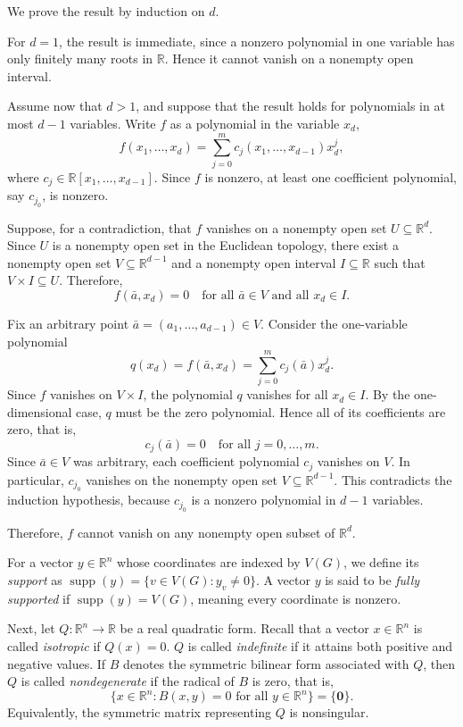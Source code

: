 \documentclass[12pt,reqno]{amsart}
\theoremstyle{definition}
\numberwithin{equation}{subsection}
\newenvironment{pf}{\proof}{\endproof}
\numberwithin{equation}{section}
\begin{document}
\begin{pf}
We prove the result by induction on $d$.

For $d=1$, the result is immediate, since a nonzero polynomial in one variable has only finitely many roots in $\mathbb{R}$. Hence it cannot vanish on a nonempty open interval.

Assume now that $d>1$, and suppose that the result holds for polynomials in at most $d-1$ variables. Write $f$ as a polynomial in the variable $x_d$,
\[
f(x_1,\dots,x_d)
=
\sum_{j=0}^{m} c_j(x_1,\dots,x_{d-1})x_d^j,
\]
where $c_j\in \mathbb{R}[x_1,\dots,x_{d-1}]$. Since $f$ is nonzero, at least one coefficient polynomial, say $c_{j_0}$, is nonzero.

Suppose, for a contradiction, that $f$ vanishes on a nonempty open set $U\subseteq \mathbb{R}^d$. Since $U$ is a nonempty open set in the Euclidean topology, there exist a nonempty open set $V\subseteq \mathbb{R}^{d-1}$ and a nonempty open interval $I\subseteq \mathbb{R}$ such that
\(
V\times I\subseteq U.
\)
Therefore,
\[
f(\bar a,x_d)=0
\quad
\text{for all } \bar a\in V \text{ and all } x_d\in I.
\]

Fix an arbitrary point $\bar a=(a_1,\dots,a_{d-1})\in V$. Consider the one-variable polynomial
\[
q(x_d)=f(\bar a,x_d)
=
\sum_{j=0}^{m} c_j(\bar a)x_d^j.
\]
Since $f$ vanishes on $V\times I$, the polynomial $q$ vanishes for all $x_d\in I$. By the one-dimensional case, $q$ must be the zero polynomial. Hence all of its coefficients are zero, that is,
\[
c_j(\bar a)=0
\quad
\text{for all } j=0,\dots,m.
\]
Since $\bar a\in V$ was arbitrary, each coefficient polynomial $c_j$ vanishes on $V$. In particular, $c_{j_0}$ vanishes on the nonempty open set $V\subseteq \mathbb{R}^{d-1}$. This contradicts the induction hypothesis, because $c_{j_0}$ is a nonzero polynomial in $d-1$ variables.

Therefore, $f$ cannot vanish on any nonempty open subset of $\mathbb{R}^d$.
\end{pf}

For a vector $y \in \mathbb{R}^n$ whose coordinates are indexed by $V(G)$, we define its \emph{support} as $\operatorname{supp}(y)=\{v \in V(G) : y_v\ne0\}$. A vector $y$ is said to be \emph{fully supported} if $\operatorname{supp}(y)=V(G)$, meaning every coordinate is nonzero.

Next, let $Q: \mathbb{R}^n \rightarrow \mathbb{R}$ be a real quadratic form. Recall that a vector $x\in\mathbb{R}^n$ is called \emph{isotropic} if $Q(x)=0$. $Q$ is called
\emph{indefinite} if it attains both positive and negative values. If $B$
denotes the symmetric bilinear form associated with $Q$, then $Q$ is called
\emph{nondegenerate} if the radical of $B$ is zero, that is,
\[
\{x\in\mathbb{R}^n:B(x,y)=0 \text{ for all } y\in\mathbb{R}^n\}=\{\mathbf{0}\}.
\]
Equivalently, the symmetric matrix representing $Q$ is nonsingular.
\end{document}
